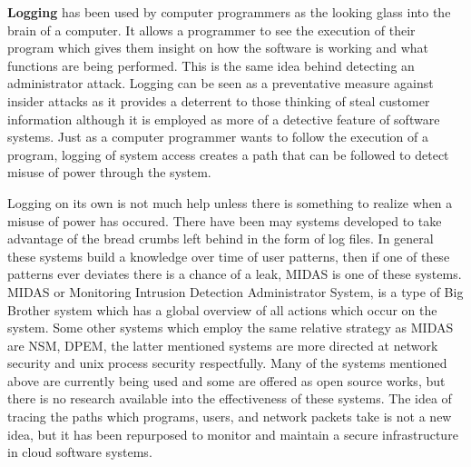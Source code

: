 \label{hlLogging}

\textbf{Logging} has been used by computer programmers as the looking glass into the brain of a computer. It allows a programmer to see the execution of their program which gives them insight on how the software is working and what functions are being performed. This is the same idea behind detecting an administrator attack. Logging can be seen as a preventative measure against insider attacks as it provides a deterrent to those thinking of steal customer information although it is employed as more of a detective feature of software systems.\cite{sirer} Just as a computer programmer wants to follow the execution of a program, logging of system access creates a path that can be followed to detect misuse of power through the system.

Logging on its own is not much help unless there is something to realize when a misuse of power has occured.\cite{althebyan} There have been may systems developed to take advantage of the bread crumbs left behind in the form of log files. In general these systems build a knowledge over time of user patterns, then if one of these patterns ever deviates there is a chance of a leak, MIDAS is one of these systems. MIDAS or Monitoring Intrusion Detection Administrator System, is a type of Big Brother system which has a global overview of all actions which occur on the system.\cite{nguyen} Some other systems which employ the same relative strategy as MIDAS are NSM, DPEM, the latter mentioned systems are more directed at network security and unix process security respectfully. Many of the systems mentioned above are currently being used and some are offered as open source works, but there is no research available into the effectiveness of these systems. The idea of tracing the paths which programs, users, and network packets take is not a new idea, but it has been repurposed to monitor and maintain a secure infrastructure in cloud software systems.\cite{nguyen}\cite{mukherjee}

\label{hlSecureHW}

